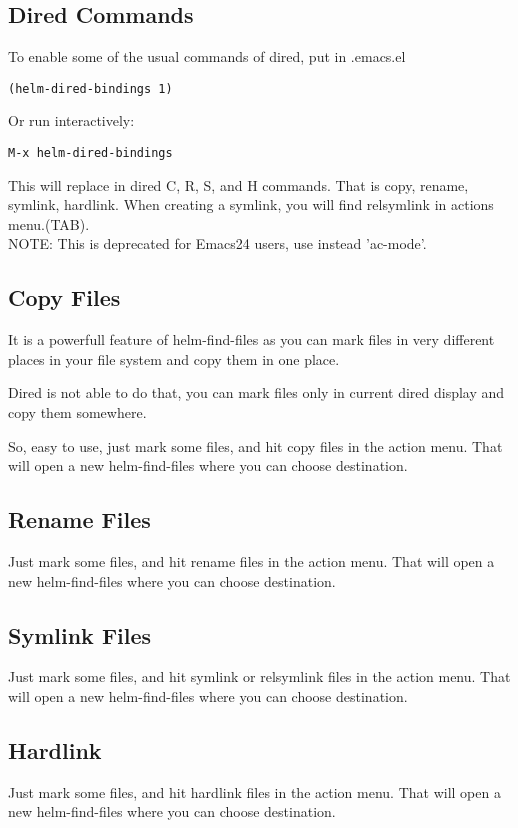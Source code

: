 \documentclass[a4paper,11pt]{article}
\begin{document}
\subsection{Dired Commands}
\label{sec:dired-commands}
To enable some of the usual commands of dired, put in .emacs.el
\begin{verbatim}
(helm-dired-bindings 1)
\end{verbatim}
Or run interactively:
\begin{verbatim}
M-x helm-dired-bindings
\end{verbatim}
This will replace in dired C, R, S, and H commands.
That is copy, rename, symlink, hardlink.
When creating a symlink, you will find relsymlink in actions menu.(TAB).\\
NOTE: This is deprecated for Emacs24 users, use instead 'ac-mode'.

\subsection{Copy Files}
\label{sec:copy-files}
It is a powerfull feature of helm-find-files as you can mark files in very different places in your
file system and copy them in one place.

Dired is not able to do that, you can mark files only in current dired display and copy them somewhere.

So, easy to use, just mark some files, and hit copy files in the action menu.
That will open a new helm-find-files where you can choose destination.
\subsection{Rename Files}
\label{sec:rename-files}
Just mark some files, and hit rename files in the action menu.
That will open a new helm-find-files where you can choose destination.
\subsection{Symlink Files}
\label{sec:symlink-files}
Just mark some files, and hit symlink or relsymlink files in the action menu.
That will open a new helm-find-files where you can choose destination.
\subsection{Hardlink}
\label{sec:hardlink}
Just mark some files, and hit hardlink files in the action menu.
That will open a new helm-find-files where you can choose destination.
\end{document}
